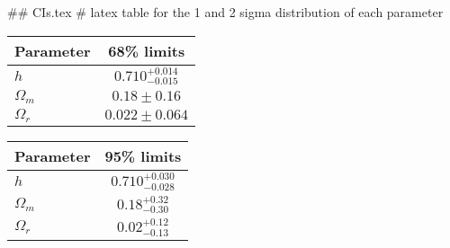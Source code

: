 ## CIs.tex
# latex table for the 1 and 2 sigma distribution of each parameter

\begin{tabular} { l  c}
 Parameter &  68\% limits\\
\hline
{\boldmath$h              $} & $0.710^{+0.014}_{-0.015}   $\\
{\boldmath$\Omega_m       $} & $0.18\pm 0.16              $\\
{\boldmath$\Omega_r       $} & $0.022\pm 0.064            $\\
\hline
\end{tabular}

\begin{tabular} { l  c}
 Parameter &  95\% limits\\
\hline
{\boldmath$h              $} & $0.710^{+0.030}_{-0.028}   $\\
{\boldmath$\Omega_m       $} & $0.18^{+0.32}_{-0.30}      $\\
{\boldmath$\Omega_r       $} & $0.02^{+0.12}_{-0.13}      $\\
\hline
\end{tabular}
